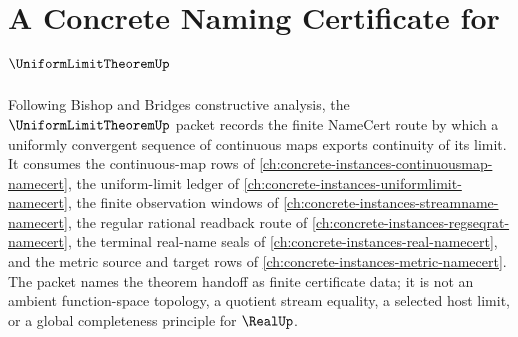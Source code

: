 \chapter{A Concrete Naming Certificate for $\UniformLimitTheoremUp$}
\label{ch:concrete-instances-uniform-limit-theorem-namecert}

Following Bishop and Bridges constructive analysis, the $\UniformLimitTheoremUp$ packet records the finite NameCert route by which a uniformly convergent sequence of continuous maps exports continuity of its limit. It consumes the continuous-map rows of \autoref{ch:concrete-instances-continuousmap-namecert}, the uniform-limit ledger of \autoref{ch:concrete-instances-uniformlimit-namecert}, the finite observation windows of \autoref{ch:concrete-instances-streamname-namecert}, the regular rational readback route of \autoref{ch:concrete-instances-regseqrat-namecert}, the terminal real-name seals of \autoref{ch:concrete-instances-real-namecert}, and the metric source and target rows of \autoref{ch:concrete-instances-metric-namecert}. The packet names the theorem handoff as finite certificate data; it is not an ambient function-space topology, a quotient stream equality, a selected host limit, or a global completeness principle for $\RealUp$.

